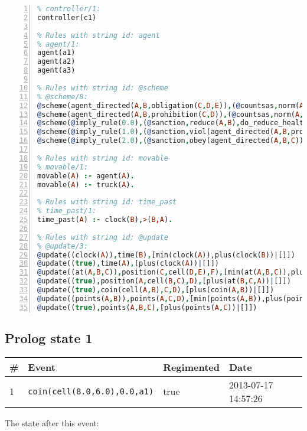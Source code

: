 \documentclass[11pt]{article}\usepackage[utf8]{inputenc}\usepackage{geometry}
\begin{document}
\begin{lstlisting}[language=Prolog, numbers=left]
% Rules with string id: controller
% controller/1:
controller(c1)

% Rules with string id: agent
% agent/1:
agent(a1)
agent(a2)
agent(a3)

% Rules with string id: @scheme
% @scheme/8:
@scheme(agent_directed(A,B,obligation(C,D,E)),(@countsas,norm(A,B,F,obligation(C,D,E)),F),false,(listTrue(C)),(time_past(D)),false,[plus(viol(agent_directed(A,B,obligation(C,D,E))))|[]],[plus(obey(agent_directed(A,B,obligation(C,D,E))))|[]])
@scheme(agent_directed(A,B,prohibition(C,D)),(@countsas,norm(A,B,E,prohibition(C,D)),E),(listTrue(C)),false,(false),false,[plus(viol(agent_directed(A,B,prohibition(C,D))))|[]],[plus(obey(agent_directed(A,B,prohibition(C,D))))|[]])
@scheme(@imply_rule(0.0),(@sanction,reduce(A,B),do_reduce_health(A,B),notifyAgent(A,changed(status))),true,false,false,false,[min(reduce(A,B))|[]],[])
@scheme(@imply_rule(1.0),(@sanction,viol(agent_directed(A,B,prohibition(C,D))),do_sanction(D)),true,false,false,false,[min(viol(agent_directed(A,B,prohibition(C,D))))|[]],[])
@scheme(@imply_rule(2.0),(@sanction,obey(agent_directed(A,B,C))),true,false,false,false,[min(obey(agent_directed(A,B,C)))|[]],[])

% Rules with string id: movable
% movable/1:
movable(A) :- agent(A).
movable(A) :- truck(A).

% Rules with string id: time_past
% time_past/1:
time_past(A) :- clock(B),>(B,A).

% Rules with string id: @update
% @update/3:
@update((clock(A)),time(B),[min(clock(A)),plus(clock(B))|[]])
@update((true),time(A),[plus(clock(A))|[]])
@update((at(A,B,C)),position(C,cell(D,E),F),[min(at(A,B,C)),plus(at(D,E,C))|[]])
@update((true),position(A,cell(B,C),D),[plus(at(B,C,A))|[]])
@update((true),coin(cell(A,B),C,D),[plus(coin(A,B))|[]])
@update((points(A,B)),points(A,C,D),[min(points(A,B)),plus(points(A,D))|[]])
@update((true),points(A,B,C),[plus(points(A,C))|[]])

\end{lstlisting}
\clearpage 
\subsection{Prolog state 1}
\begin{table}[ht]
\centering 
\begin{tabular}{l l l l} 
\textbf{\#} & \textbf{Event} & \textbf{Regimented} & \textbf{Date} \\ [0.5ex] 
\hline
1&\texttt{coin(cell(8.0,6.0),0.0,a1)}&true&2013-07-17 14:57:26\\ [1ex] \hline\end{tabular}
\end{table}
The state after this event:
\end{document}
